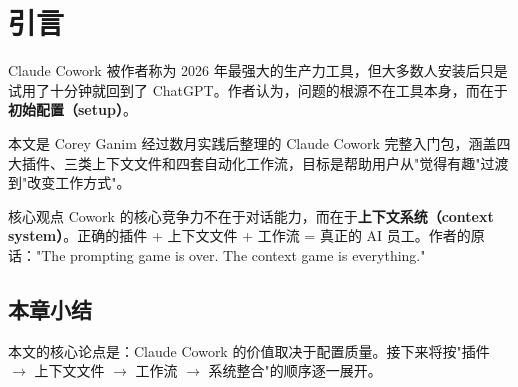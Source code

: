 \section{引言}

Claude Cowork 被作者称为 2026 年最强大的生产力工具，但大多数人安装后只是试用了十分钟就回到了 ChatGPT。作者认为，问题的根源不在工具本身，而在于\textbf{初始配置（setup）}。

本文是 Corey Ganim 经过数月实践后整理的 Claude Cowork 完整入门包，涵盖四大插件、三类上下文文件和四套自动化工作流，目标是帮助用户从"觉得有趣"过渡到"改变工作方式"。

\begin{importantbox}{核心观点}
Cowork 的核心竞争力不在于对话能力，而在于\textbf{上下文系统（context system）}。正确的插件 + 上下文文件 + 工作流 = 真正的 AI 员工。作者的原话："The prompting game is over. The context game is everything."
\end{importantbox}

\subsection{本章小结}

本文的核心论点是：Claude Cowork 的价值取决于配置质量。接下来将按"插件 $\to$ 上下文文件 $\to$ 工作流 $\to$ 系统整合"的顺序逐一展开。

